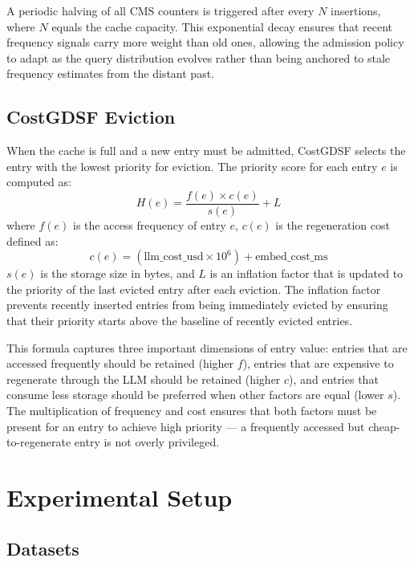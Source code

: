 \documentclass[conference]{IEEEtran}
\begin{document}
A periodic halving of all CMS counters is triggered after every $N$ insertions, where $N$ equals the cache capacity. This exponential decay ensures that recent frequency signals carry more weight than old ones, allowing the admission policy to adapt as the query distribution evolves rather than being anchored to stale frequency estimates from the distant past.

\subsection{CostGDSF Eviction}

When the cache is full and a new entry must be admitted, CostGDSF selects the entry with the lowest priority for eviction. The priority score for each entry $e$ is computed as:
\begin{equation}
H(e) = \frac{f(e) \times c(e)}{s(e)} + L
\label{eq:gdsf}
\end{equation}
where $f(e)$ is the access frequency of entry $e$, $c(e)$ is the regeneration cost defined as:
\begin{equation}
c(e) = (\text{llm\_cost\_usd} \times 10^6) + \text{embed\_cost\_ms}
\label{eq:cost}
\end{equation}
$s(e)$ is the storage size in bytes, and $L$ is an inflation factor that is updated to the priority of the last evicted entry after each eviction. The inflation factor prevents recently inserted entries from being immediately evicted by ensuring that their priority starts above the baseline of recently evicted entries.

This formula captures three important dimensions of entry value: entries that are accessed frequently should be retained (higher $f$), entries that are expensive to regenerate through the LLM should be retained (higher $c$), and entries that consume less storage should be preferred when other factors are equal (lower $s$). The multiplication of frequency and cost ensures that both factors must be present for an entry to achieve high priority --- a frequently accessed but cheap-to-regenerate entry is not overly privileged.

\section{Experimental Setup}

\subsection{Datasets}
\end{document}
